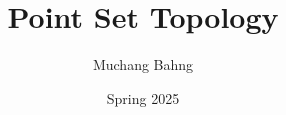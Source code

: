 \documentclass{article}
\begin{document}
\title{Point Set Topology}
\author{Muchang Bahng}
\date{Spring 2025}

\maketitle
\tableofcontents
\pagebreak


 







\end{document}
